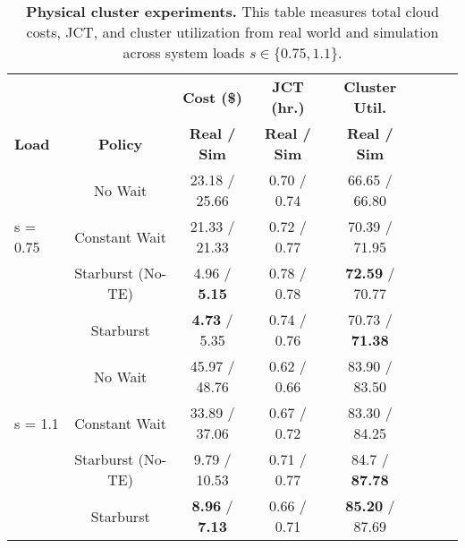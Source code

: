 \begin{table}[t!]
\centering
\footnotesize
\setlength{\tabcolsep}{4pt}
\begin{tabular}{@{}lccccccc@{}}
\toprule
 &  & \multicolumn{1}{c}{\textbf{Cost (\$)}} & \multicolumn{1}{c}{\textbf{JCT (hr.)}} & \multicolumn{1}{c}{\textbf{Cluster Util.}} \\
\textbf{Load} & \textbf{Policy} & \footnotesize\textbf{Real / Sim} & \footnotesize\textbf{Real / Sim} & \footnotesize\textbf{Real / Sim} \\ 
\midrule
 & No Wait & 23.18 / 25.66 & 0.70 / 0.74 & 66.65 / 66.80 \\
s = 0.75  & Constant Wait & 21.33 / 21.33 & 0.72 / 0.77 & 70.39 / 71.95 \\
 & Starburst (No-TE) & 4.96 / \textbf{5.15} & 0.78 / 0.78 & \textbf{72.59} / 70.77 \\
 & Starburst & \textbf{4.73} / 5.35 & 0.74 / 0.76 & 70.73 / \textbf{71.38} \\
\midrule
& No Wait & 45.97 / 48.76 & 0.62 / 0.66 & 83.90 / 83.50 \\
s = 1.1 & Constant Wait & 33.89 / 37.06 & 0.67 / 0.72 & 83.30 / 84.25 \\
& Starburst (No-TE) & 9.79 / 10.53 & 0.71 / 0.77 & 84.7 / \textbf{87.78} \\
& Starburst & \textbf{8.96} / \textbf{7.13} & 0.66 / 0.71 & \textbf{85.20} / 87.69  \\
\bottomrule
\end{tabular}
\caption{\small\textbf{Physical cluster experiments.} This table measures total cloud costs, JCT, and cluster utilization from real world and simulation across system loads $s\in\{0.75, 1.1\}$.}
\label{tab:real_life_experiments}
\vspace{-3mm}
\end{table}
